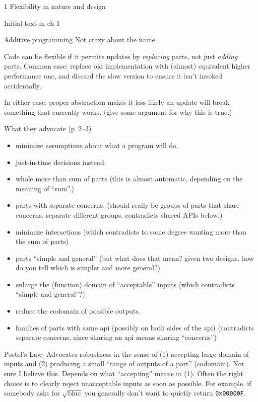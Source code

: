 \documentclass[12pt]{PalisadesLakesBook}
\begin{document}
\begin{plSection}{1 Flexibility in nature and design}
\begin{plSection}{Initial text in ch 1}
\begin{plSection}{Additive programming}
Not crazy about the name.

Code can be flexible if it permits updates by \emph{replacing}
parts, not just \emph{adding} parts.
Common case: 
replace old implementation with (almost) equivalent 
higher performance one, and discard the slow version to ensure
it isn't invoked accidentally. 

In either case, proper abstraction makes it less likely
an update will break something that currently works.
(\TODO give some argument for why this is true.)

What they advocate (p~2--3)
\begin{itemize}
  \item minimize assumptions about what a program will do.
  \item just-in-time decisions instead.
  \item whole more than sum of parts (this is almost automatic,
  depending on the meaning of ``sum''.)
  \item parts with separate concerns. (should really be groups of
  parts that share concerns, separate different groups.
  contradicts shared APIs below.)
  \item minimize interactions (which contradicts to some degree
  wanting more than the sum of parts)
  \item parts ``simple and general'' 
  (but what does that mean? given two designs, how do you
  tell which is simpler and more general?)
  \item enlarge the (function) domain of ``acceptable'' inputs
  (which contradicts ``simple and general''?)
  \item reduce the codomain of possible outputs. 
  \item families of parts with same api (possibly on both sides
  of the api) (contradicts separate concerns, since sharing
  an api means sharing ``concerns'')
\end{itemize}

Postel's Law: Advocates robustness in the sense of
(1) accepting large domain of inputs
and (2) producing a small ``range of outputs of a part'' 
(codomain).
Not sure I believe this.
Depends on what ``accepting'' means in (1).
Often the right choice is to clearly reject unacceptable inputs
as soon as possible.
For example, if somebody asks for $\sqrt{\text{blue}}$
you generally don't want to quietly return \texttt{0x00000F}.


\end{plSection}
\end{plSection}
\end{plSection}
\end{document}
